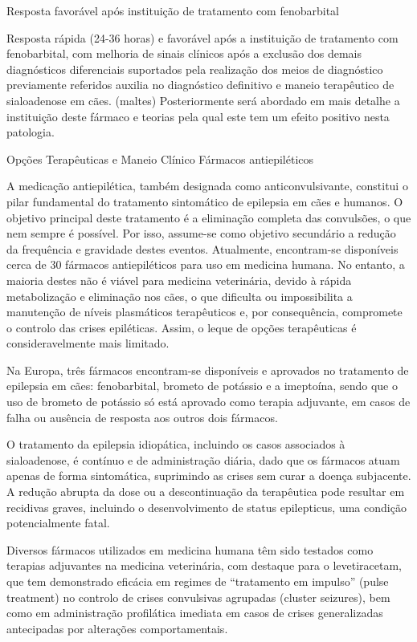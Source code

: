 Resposta favorável após instituição de tratamento com fenobarbital

Resposta rápida (24-36 horas) e favorável após a instituição de tratamento com fenobarbital, com melhoria de sinais clínicos após a exclusão dos demais diagnósticos diferenciais suportados pela realização dos meios de diagnóstico previamente referidos auxilia no diagnóstico definitivo e maneio terapêutico de sialoadenose em cães. (maltes) Posteriormente será abordado em mais detalhe a instituição deste fármaco e teorias pela qual este tem um efeito positivo nesta patologia. 

Opções Terapêuticas e Maneio Clínico 
Fármacos antiepiléticos


A medicação antiepilética, também designada como anticonvulsivante, constitui o pilar fundamental do tratamento sintomático de epilepsia em cães e humanos. O objetivo principal deste tratamento é a eliminação completa das convulsões, o que nem sempre é possível. Por isso, assume-se como objetivo secundário a redução da frequência e gravidade destes eventos.\cite{Loscher2022}
Atualmente, encontram-se disponíveis cerca de 30 fármacos antiepiléticos para uso em medicina humana. No entanto, a maioria destes não é viável para medicina veterinária, devido à rápida metabolização e eliminação nos cães, o que dificulta ou impossibilita a manutenção de níveis plasmáticos terapêuticos e, por consequência, compromete o controlo das crises epiléticas. \cite{Loscher2022} Assim, o leque de opções terapêuticas é consideravelmente mais limitado. \cite{Loscher2022}


Na Europa, três fármacos encontram-se disponíveis e aprovados no tratamento de epilepsia em cães: fenobarbital, brometo de potássio e a imeptoína, sendo que o uso de brometo de potássio só está aprovado como terapia adjuvante, em casos de falha ou ausência de resposta aos outros dois fármacos. \cite{Royaux2017}


O tratamento da epilepsia idiopática, incluindo os casos associados à sialoadenose, é contínuo e de administração diária, dado que os fármacos atuam apenas de forma sintomática, suprimindo as crises sem curar a doença subjacente. A redução abrupta da dose ou a descontinuação da terapêutica pode resultar em recidivas graves, incluindo o desenvolvimento de status epilepticus, uma condição potencialmente fatal. 


Diversos fármacos utilizados em medicina humana têm sido testados como terapias adjuvantes na medicina veterinária, com destaque para o levetiracetam, que tem demonstrado eficácia em regimes de “tratamento em impulso” (pulse treatment) no controlo de crises convulsivas agrupadas (cluster seizures), bem como em administração profilática imediata em casos de crises generalizadas antecipadas por alterações comportamentais. 


